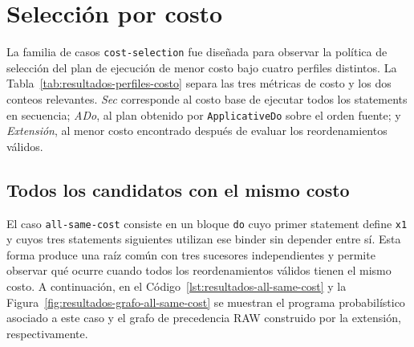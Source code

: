 
\section{Selección por costo}
\label{sec:resultados-costos}

La familia de casos \texttt{cost-selection} fue diseñada para observar la política de selección del plan de ejecución de menor costo bajo cuatro perfiles distintos. La Tabla~\ref{tab:resultados-perfiles-costo} separa las tres métricas de costo y los dos conteos relevantes. \textit{Sec} corresponde al costo base de ejecutar todos los statements en secuencia; \textit{ADo}, al plan obtenido por \texttt{ApplicativeDo} sobre el orden fuente; y \textit{Extensión}, al menor costo encontrado después de evaluar los reordenamientos válidos.

\begin{table}[ht]
\centering
\begingroup
\setlength{\TableColumnPadding}{5pt}
\TableSetup
{}
\endgroup
\caption{Costos y cantidades de reordenamientos de la familia \texttt{cost-selection}.}
\label{tab:resultados-perfiles-costo}
\end{table}

\subsection{Todos los candidatos con el mismo costo}

El caso \texttt{all-same-cost} consiste en un bloque \texttt{do} cuyo primer statement define \texttt{x1} y cuyos tres statements siguientes utilizan ese binder sin depender entre sí. Esta forma produce una raíz común con tres sucesores independientes y permite observar qué ocurre cuando todos los reordenamientos válidos tienen el mismo costo. A continuación, en el Código~\ref{lst:resultados-all-same-cost} y la Figura~\ref{fig:resultados-grafo-all-same-cost} se muestran el programa probabilístico asociado a este caso y el grafo de precedencia RAW construido por la extensión, respectivamente.

